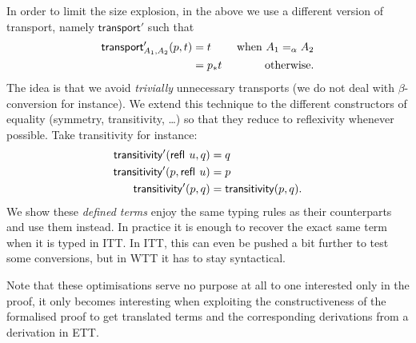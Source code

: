 In order to limit the size explosion, in the above we use a different version of
transport, namely $\mathsf{transport}'$ such that
%
\begin{align*}
  \mathsf{transport}'_{A_1,A_2}(p,t) &= t &\text{ when } A_1 =_\alpha A_2 \\
  &= p_*{t} &\text{ otherwise.}
\end{align*}
%
The idea is that we avoid \emph{trivially} unnecessary transports (we do not
deal with $\beta$-conversion for instance).
We extend this technique to the different constructors of equality (symmetry,
transitivity, \dots) so that they reduce to reflexivity whenever possible.
Take transitivity for instance:
%
\begin{align*}
  \mathsf{transitivity}'({\mathsf{refl}}_{}\  u,q) &= q \\
  \mathsf{transitivity}'(p,{\mathsf{refl}}_{}\  u) &= p \\
  \mathsf{transitivity}'(p,q) &= \mathsf{transitivity}(p,q).
\end{align*}
%
We show these \emph{defined terms} enjoy the same typing rules as their
counterparts and use them instead.
In practice it is enough to recover the exact same term when it is typed in
\acrshort{ITT}.
In \acrshort{ITT}, this can even be pushed a bit further to test some
conversions, but in \acrshort{WTT} it has to stay syntactical.

Note that these optimisations serve no purpose at all to one interested only in
the proof, it only becomes interesting when exploiting the constructiveness of
the formalised proof to get translated terms and the corresponding derivations
from a derivation in \acrshort{ETT}.